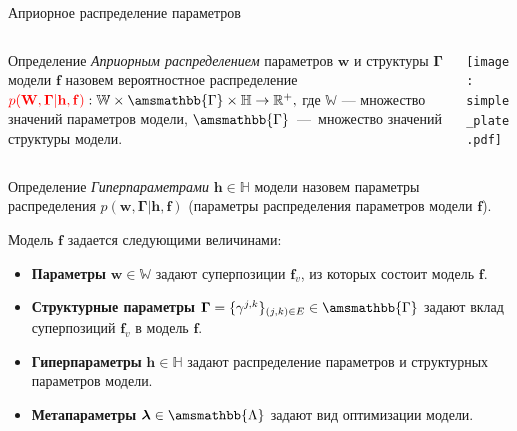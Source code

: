 \documentclass[usenames,dvipsnames,11pt,pdf,utf8,russian,aspectratio=43]{beamer}
\begin{document}
\begin{frame}{Априорное распределение параметров}
\footnotesize   
\begin{columns}
\begin{column}{0.6\textwidth}
   \begin{block}{Определение}
\textit{Априорным распределением} параметров $\mathbf{w}$ и структуры  $\boldsymbol{\Gamma}$ модели $\mathbf{f}$ назовем вероятностное распределение
$
    \textcolor{red}{p(\mathbf{W}, \boldsymbol{\Gamma}|\mathbf{h},\mathbf{f})}: \mathbb{W} \times \amsmathbb{\Gamma} \times \mathbb{H} \to \mathbb{R}^{+}, 
$
где $\mathbb{W}$ --- множество значений параметров модели, $\amsmathbb{\Gamma}$~---~множество значений структуры модели.
\end{block}

\end{column}
\begin{column}{0.4\textwidth}  %
    \begin{center}
     \texttt{[image: simple\_plate.pdf]}
     \end{center}
\end{column}
\end{columns}
\vspace*{-0.5cm}
\begin{block}{Определение}
\textit{Гиперпараметрами} $\mathbf{h}\in \mathbb{H}$ модели  назовем параметры распределения $p(\mathbf{w}, \boldsymbol{\Gamma}|\mathbf{h},\mathbf{f})$ (параметры распределения параметров модели $\mathbf{f}$).
 
\end{block}
Модель $\mathbf{f}$ задается следующими величинами:
\begin{itemize}
\item \textbf{Параметры} $\mathbf{w} \in \mathbb{W}$ задают суперпозиции $\mathbf{f}_v$, из которых состоит модель $\mathbf{f}$.
\item \textbf{Структурные параметры} $\boldsymbol{\Gamma}=\{\gamma^{j,k}\}_{(j,k)\in E} \in \amsmathbb{\Gamma}$ задают вклад суперпозиций $\mathbf{f}_v$ в модель $\mathbf{f}$.
\item \textbf{Гиперпараметры} $\mathbf{h} \in \mathbb{H}$ задают распределение параметров и структурных параметров модели.
\item \textbf{Метапараметры} $\boldsymbol{\lambda} \in \amsmathbb{\Lambda}$ задают вид оптимизации модели.
\end{itemize}

\end{frame}
\end{document}

